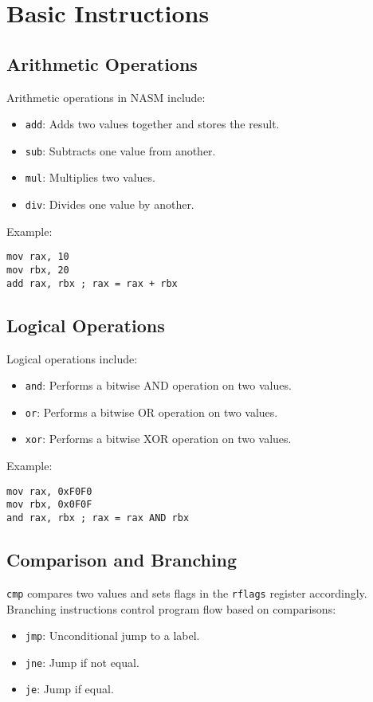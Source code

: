 \documentclass{article}
\begin{document}
\section{Basic Instructions}

\subsection{Arithmetic Operations}
Arithmetic operations in NASM include:
\begin{itemize}
    \item \texttt{add}: Adds two values together and stores the result.
    \item \texttt{sub}: Subtracts one value from another.
    \item \texttt{mul}: Multiplies two values.
    \item \texttt{div}: Divides one value by another.
\end{itemize}

Example:
\begin{lstlisting}
mov rax, 10
mov rbx, 20
add rax, rbx ; rax = rax + rbx
\end{lstlisting}

\subsection{Logical Operations}
Logical operations include:
\begin{itemize}
    \item \texttt{and}: Performs a bitwise AND operation on two values.
    \item \texttt{or}: Performs a bitwise OR operation on two values.
    \item \texttt{xor}: Performs a bitwise XOR operation on two values.
\end{itemize}

Example:
\begin{lstlisting}
mov rax, 0xF0F0
mov rbx, 0x0F0F
and rax, rbx ; rax = rax AND rbx
\end{lstlisting}

\subsection{Comparison and Branching}
\texttt{cmp} compares two values and sets flags in the \texttt{rflags} register accordingly. Branching instructions control program flow based on comparisons:
\begin{itemize}
    \item \texttt{jmp}: Unconditional jump to a label.
    \item \texttt{jne}: Jump if not equal.
    \item \texttt{je}: Jump if equal.
\end{itemize}
\end{document}
